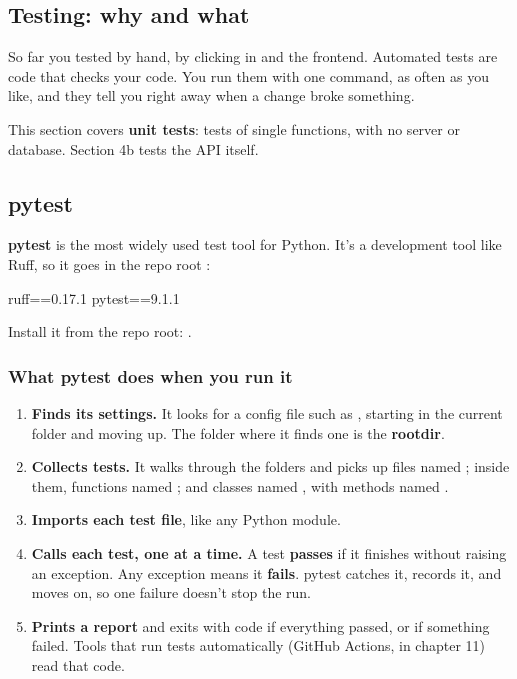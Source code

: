 \subsection{Testing: why and what}

So far you tested by hand, by clicking in  and the frontend. Automated tests are code that checks your code. You run them with one command, as often as you like, and they tell you right away when a change broke something.

This section covers \textbf{unit tests}: tests of single functions, with no server or database. Section 4b tests the API itself.

\subsection{pytest}

\textbf{pytest} is the most widely used test tool for Python. It's a development tool like Ruff, so it goes in the repo root :

\begin{code}
ruff==0.17.1
pytest==9.1.1
\end{code}

Install it from the repo root: .

\subsubsection{What pytest does when you run it}

\begin{enumerate}
\item \textbf{Finds its settings.} It looks for a config file such as , starting in the current folder and moving up. The folder where it finds one is the \textbf{rootdir}.
\item \textbf{Collects tests.} It walks through the folders and picks up files named ; inside them, functions named ; and classes named , with methods named .
\item \textbf{Imports each test file}, like any Python module.
\item \textbf{Calls each test, one at a time.} A test \textbf{passes} if it finishes without raising an exception. Any exception means it \textbf{fails}. pytest catches it, records it, and moves on, so one failure doesn't stop the run.
\item \textbf{Prints a report} and exits with code  if everything passed, or  if something failed. Tools that run tests automatically (GitHub Actions, in chapter 11) read that code.
\end{enumerate}

